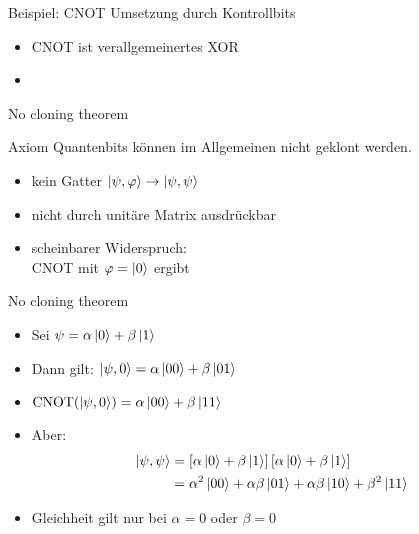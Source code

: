 \documentclass[xcolor=colortbl
,ngerman
]{beamer}
\begin{document}
\begin{frame}[t]{Beispiel: CNOT} 
    Umsetzung durch Kontrollbits
    \begin{example}
        \begin{itemize}
            \item CNOT ist verallgemeinertes XOR

            \item \CNOTFormula

        \end{itemize}
    \end{example}
\end{frame}

\begin{frame}{No cloning theorem}
    \begin{block}{Axiom}
        Quantenbits können im Allgemeinen nicht geklont werden.
    \end{block}
    \begin{itemize}
            \pause
        \item kein Gatter $\left|\psi,\varphi\right\rangle \rightarrow \left|\psi,\psi\right\rangle$
        \item nicht durch unitäre Matrix ausdrückbar
        \pause
        \item \alert{scheinbarer Widerspruch:} \\ CNOT mit $\varphi=\left|0\right\rangle$ ergibt 

    \end{itemize}
\end{frame}

\begin{frame}{No cloning theorem}
    \newcommand{\psiReg}{\alpha \qreg 0 + \beta \qreg 1}
    \begin{itemize}
        \item Sei \( \psi = \alpha \left|0\right\rangle + \beta \left|1\right\rangle \)
        \item Dann gilt: \( \left|\psi,0\right\rangle = \alpha \left|00\right\rangle + \beta \left|01\right\rangle \)
        \item \( \operatorname{CNOT}(\left|\psi,0\right\rangle) = \alpha \left|00\right\rangle + \beta \left|11\right\rangle  \)

        \pause
        \item \alert{Aber:}
            \[
                \begin{split}
                    \qreg{\psi,\psi} &= \left[\psiReg \right]\left[\psiReg \right] \\
                        &= \alpha^2 \qreg{00} + \alpha\beta\qreg{01} + \alpha\beta\qreg{10} + \beta^2\qreg{11}
                \end{split}
            \]
        \pause
        \item Gleichheit gilt nur bei $\alpha=0$ oder $\beta=0$
    \end{itemize}
\end{frame}
\end{document}
